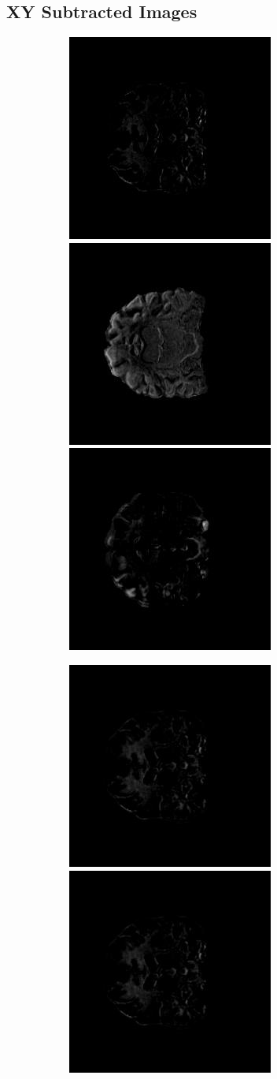 \documentclass[12pt, fleqn, titlepage]{article}
\newcommand\skipperer{0.45pt}
\newcommand\ripperer{1.25pt}
\begin{document}
\subsection{XY Subtracted Images}\label{xy_subtracted_images}
\begin{figure}[H]
	\centering
	\begin{subfigure}[b]{0.8\textwidth}
		\centering
		\includegraphics[width=0.22\linewidth]{imgs/subtracted_images/xy/002_S_0559_xy_gts_comparison}
		\hskip\skipperer
		\includegraphics[width=0.22\linewidth]{imgs/subtracted_images/xy/082_S_0469_xy_gts_comparison}
		\hskip\skipperer
		\includegraphics[width=0.22\linewidth]{imgs/subtracted_images/xy/136_S_0196_xy_gts_comparison}
	\end{subfigure}
	\vskip\ripperer
	\begin{subfigure}[b]{0.8\textwidth}
		\centering
		\includegraphics[width=0.22\linewidth]{imgs/subtracted_images/xy/002_S_0559_xy_1.5_1.5gen_comparison}
		\hskip\skipperer
		\includegraphics[width=0.22\linewidth]{imgs/subtracted_images/xy/002_S_0559_xy_1.5_1.5gen_comparison}

\end{subfigure}
\end{figure}
\end{document}
